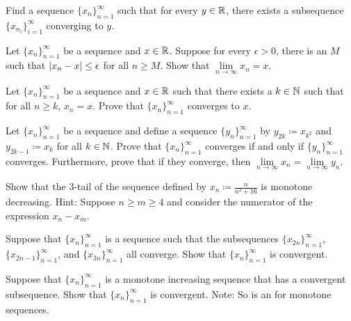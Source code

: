 \begin{exercise}[Tricky]
Find a sequence $\{ x_n \}_{n=1}^\infty$ such that for every $y \in {\mathbb{R}}$, there exists a
subsequence $\{ x_{n_i} \}_{i=1}^\infty$ converging to $y$.
\end{exercise}

\begin{exercise}[Easy]
Let $\{ x_n \}_{n=1}^\infty$ be a sequence and $x \in {\mathbb{R}}$.
Suppose for every $\epsilon > 0$, there is an $M$ such that
$\left\lvert {x_n-x} \right\rvert \leq \epsilon$ for all $n \geq M$.
Show that $\lim\limits_{n\to\infty} x_n = x$.
\end{exercise}

\begin{exercise}[Easy]
Let $\{ x_n \}_{n=1}^\infty$ be a sequence and $x \in {\mathbb{R}}$ such that
there exists a $k \in {\mathbb{N}}$ such that for all $n \geq k$,
$x_n = x$.  Prove that $\{ x_n \}_{n=1}^\infty$ converges to $x$.
\end{exercise}

\begin{exercise}
Let $\{ x_n \}_{n=1}^\infty$ be a sequence and
define a sequence $\{ y_n \}_{n=1}^\infty$ by
$y_{2k} \coloneqq x_{k^2}$ and $y_{2k-1} \coloneqq x_k$ for all $k \in {\mathbb{N}}$.
Prove that $\{ x_n \}_{n=1}^\infty$ converges if and only if
$\{ y_n \}_{n=1}^\infty$ converges.
Furthermore, prove that if they converge, then
$\lim\limits_{n\to\infty} x_n = \lim\limits_{n\to\infty} y_n$.
\end{exercise}

\begin{exercise}
Show that the 3-tail of the sequence defined by $x_n \coloneqq \frac{n}{n^2+16}$ is
monotone decreasing.  Hint: Suppose $n \geq m \geq 4$ and consider the 
numerator of the expression $x_n-x_m$.
\end{exercise}

\begin{exercise}
Suppose that $\{ x_n \}_{n=1}^\infty$ is a sequence such that
the subsequences $\{ x_{2n} \}_{n=1}^\infty$, $\{ x_{2n-1} \}_{n=1}^\infty$, and
$\{ x_{3n} \}_{n=1}^\infty$ all converge.  Show that $\{ x_n \}_{n=1}^\infty$ is convergent.
\end{exercise}

\begin{exercise}
Suppose that $\{ x_n \}_{n=1}^\infty$ is a monotone increasing sequence that
has a convergent subsequence.
Show that $\{ x_n \}_{n=1}^\infty$ is convergent.
Note: So  is an  for monotone sequences.
\end{exercise}

